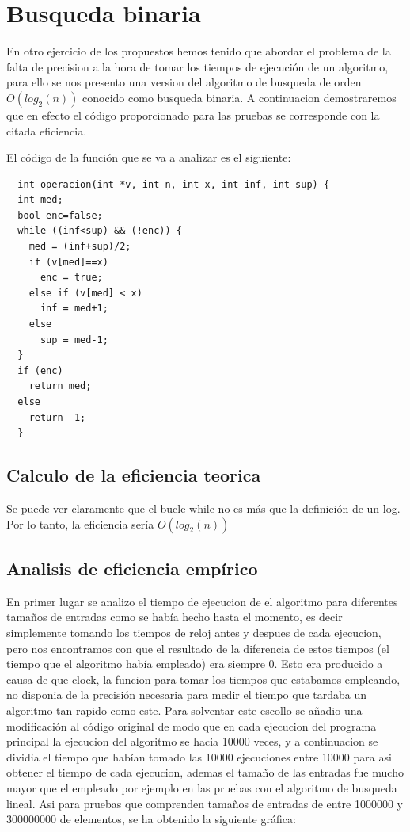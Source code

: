 \section{Busqueda binaria}
En otro ejercicio de los propuestos hemos tenido que abordar el problema de la falta de precision a la hora de tomar los tiempos de ejecución de un algoritmo, para ello se nos presento una version del algoritmo de busqueda de orden $O(log_{2}(n))$ conocido como busqueda binaria. A continuacion demostraremos que en efecto el código proporcionado para las pruebas se corresponde con la citada eficiencia.

El código de la función que se va a analizar es el siguiente:

\begin{lstlisting}
  int operacion(int *v, int n, int x, int inf, int sup) {
  int med;
  bool enc=false;
  while ((inf<sup) && (!enc)) {
    med = (inf+sup)/2; 
    if (v[med]==x) 
      enc = true;
    else if (v[med] < x) 
      inf = med+1;
    else
      sup = med-1;
  }
  if (enc) 
    return med;
  else 
    return -1;
  }
\end{lstlisting}

\subsection{Calculo de la eficiencia teorica}

Se puede ver claramente que el bucle while no es más que la definición de un log. Por lo tanto, la eficiencia sería $O(log_{2}(n))$

\subsection{Analisis de eficiencia empírico}

En primer lugar se analizo el tiempo de ejecucion de el algoritmo para diferentes tamaños de entradas como se había hecho hasta el momento, es decir simplemente tomando los tiempos de reloj antes y despues de cada ejecucion, pero nos encontramos con que el resultado de la diferencia de estos tiempos (el tiempo que el algoritmo había empleado) era siempre 0. Esto era producido a causa de que clock, la funcion para tomar los tiempos que estabamos empleando, no disponia de la precisión necesaria para medir el tiempo que tardaba un algoritmo tan rapido como este. Para solventar este escollo se añadio una modificación al código original de modo que en cada ejecucion del programa principal la ejecucion del algoritmo se hacia 10000 veces, y a continuacion se dividia el tiempo que habían tomado las 10000 ejecuciones entre 10000 para asi obtener el tiempo de cada ejecucion, ademas el tamaño de las entradas fue mucho mayor que el empleado por ejemplo en las pruebas con el algoritmo de busqueda lineal. Asi para pruebas que comprenden tamaños de entradas de entre 1000000 y 300000000 de elementos, se ha obtenido la siguiente gráfica:

